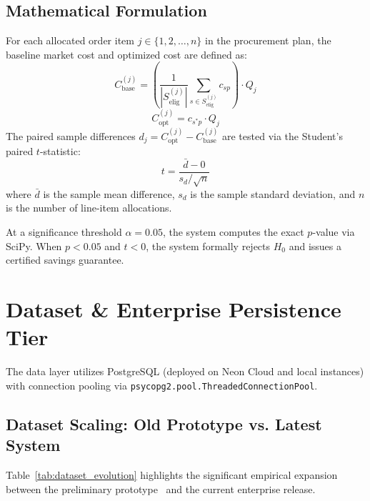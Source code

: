 \documentclass[conference]{IEEEtran}
\begin{document}
\subsection{Mathematical Formulation}
For each allocated order item $j \in \{1, 2, \dots, n\}$ in the procurement plan, the baseline market cost and optimized cost are defined as:
\begin{equation}
C_{\text{base}}^{(j)} = \left(\frac{1}{|S_{\text{elig}}^{(j)}|} \sum_{s \in S_{\text{elig}}^{(j)}} c_{sp}\right) \cdot Q_j
\label{eq:base_cost}
\end{equation}
\begin{equation}
C_{\text{opt}}^{(j)} = c_{s^* p} \cdot Q_j
\label{eq:opt_cost}
\end{equation}
The paired sample differences $d_j = C_{\text{opt}}^{(j)} - C_{\text{base}}^{(j)}$ are tested via the Student's paired $t$-statistic:
\begin{equation}
t = \frac{\bar{d} - 0}{s_d / \sqrt{n}}
\label{eq:t_stat}
\end{equation}
where $\bar{d}$ is the sample mean difference, $s_d$ is the sample standard deviation, and $n$ is the number of line-item allocations.

At a significance threshold $\alpha = 0.05$, the system computes the exact $p$-value via SciPy. When $p < 0.05$ and $t < 0$, the system formally rejects $H_0$ and issues a certified savings guarantee.

\section{Dataset \& Enterprise Persistence Tier}
The data layer utilizes PostgreSQL (deployed on Neon Cloud and local instances) with connection pooling via \texttt{psycopg2.pool.ThreadedConnectionPool}.

\subsection{Dataset Scaling: Old Prototype vs. Latest System}
Table~\ref{tab:dataset_evolution} highlights the significant empirical expansion between the preliminary prototype~\cite{invagent2024} and the current enterprise release.
\end{document}
